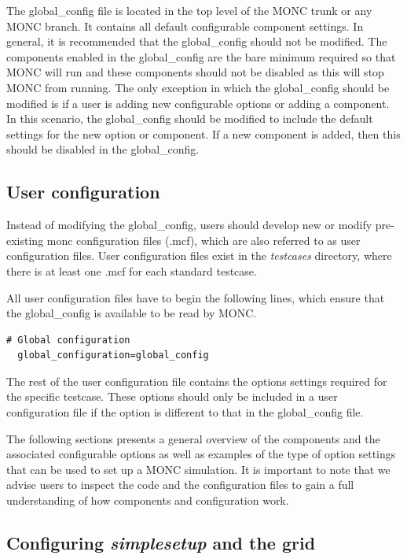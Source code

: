 \documentclass[a4paper,11pt]{article}
\begin{document}
The global\_config file is located in the top level of the MONC trunk
or any MONC branch. It contains all default configurable component settings.
In general, it is recommended that the global\_config should not be modified.
The components enabled in the global\_config are the bare
minimum required so that MONC will run and these components should not be
disabled as this will stop MONC from running. The only exception in which the
global\_config should be modified is if a user is adding new configurable
options or adding a component. In this scenario, the global\_config should
be modified to include the default settings for the new option or component.
If a new component is added, then this should be disabled in the
global\_config.

\subsection{User configuration}

Instead of modifying the global\_config, users should develop new or
modify pre-existing monc configuration files (.mcf), which are also referred to
as user configuration files. User configuration files exist in the \emph{testcases}
directory, where there is at least one .mcf for each standard testcase.

All user configuration files have to begin the following lines, which ensure
that the global\_config is available to be read by MONC.
\begin{lstlisting}[caption={Example configuration snippet for compulsory first lines
  from testcases/stratus/fire\_sc.mcf}]
  # Global configuration
  global_configuration=global_config
\end{lstlisting}

The rest of the user configuration file contains the options settings required for the
specific testcase. These options should only be included in a user configuration
file if the option is different to that in the global\_config file.

The following sections presents a general overview of the components and the associated
configurable options as well as examples of the type of option settings that can
be used to set up a MONC simulation. It is important to note that we advise users
to inspect the code and the configuration files to gain a full understanding of
how components and configuration work.

\subsection{Configuring \emph{simplesetup} and the grid}
\end{document}

